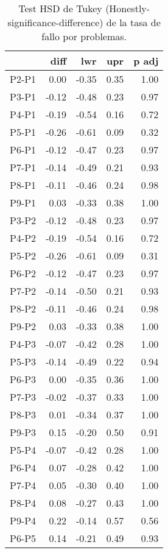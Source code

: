 \begin{table}[ht]
\centering
\caption{Test HSD de Tukey (Honestly-significance-difference) de la tasa de fallo por problemas.}
\label{tab:Tukeyfailratio}
\begin{tabular}{rrrrr}
  \hline
 & diff & lwr & upr & p adj \\ 
  \hline
P2-P1 & 0.00 & -0.35 & 0.35 & 1.00 \\ 
  P3-P1 & -0.12 & -0.48 & 0.23 & 0.97 \\ 
  P4-P1 & -0.19 & -0.54 & 0.16 & 0.72 \\ 
  P5-P1 & -0.26 & -0.61 & 0.09 & 0.32 \\ 
  P6-P1 & -0.12 & -0.47 & 0.23 & 0.97 \\ 
  P7-P1 & -0.14 & -0.49 & 0.21 & 0.93 \\ 
  P8-P1 & -0.11 & -0.46 & 0.24 & 0.98 \\ 
  P9-P1 & 0.03 & -0.33 & 0.38 & 1.00 \\ 
  P3-P2 & -0.12 & -0.48 & 0.23 & 0.97 \\ 
  P4-P2 & -0.19 & -0.54 & 0.16 & 0.72 \\ 
  P5-P2 & -0.26 & -0.61 & 0.09 & 0.31 \\ 
  P6-P2 & -0.12 & -0.47 & 0.23 & 0.97 \\ 
  P7-P2 & -0.14 & -0.50 & 0.21 & 0.93 \\ 
  P8-P2 & -0.11 & -0.46 & 0.24 & 0.98 \\ 
  P9-P2 & 0.03 & -0.33 & 0.38 & 1.00 \\ 
  P4-P3 & -0.07 & -0.42 & 0.28 & 1.00 \\ 
  P5-P3 & -0.14 & -0.49 & 0.22 & 0.94 \\ 
  P6-P3 & 0.00 & -0.35 & 0.36 & 1.00 \\ 
  P7-P3 & -0.02 & -0.37 & 0.33 & 1.00 \\ 
  P8-P3 & 0.01 & -0.34 & 0.37 & 1.00 \\ 
  P9-P3 & 0.15 & -0.20 & 0.50 & 0.91 \\ 
  P5-P4 & -0.07 & -0.42 & 0.28 & 1.00 \\ 
  P6-P4 & 0.07 & -0.28 & 0.42 & 1.00 \\ 
  P7-P4 & 0.05 & -0.30 & 0.40 & 1.00 \\ 
  P8-P4 & 0.08 & -0.27 & 0.43 & 1.00 \\ 
  P9-P4 & 0.22 & -0.14 & 0.57 & 0.56 \\ 
  P6-P5 & 0.14 & -0.21 & 0.49 & 0.93 \\ 

\end{tabular}
\end{table}
